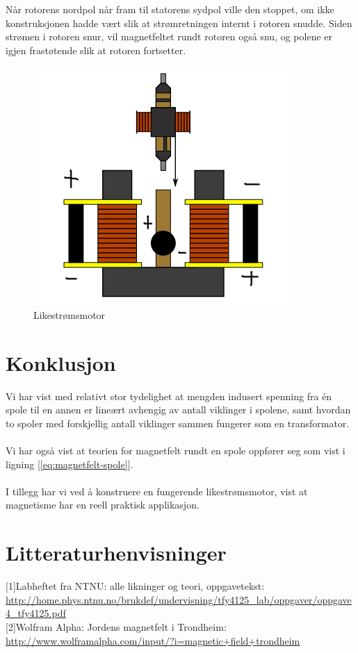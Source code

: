 \documentclass[12pt,norsk,a4paper]{article}
\begin{document}
 Når rotorens nordpol når fram til statorens sydpol ville den stoppet, om ikke konstruksjonen hadde vært slik at strømretningen internt i rotoren snudde. Siden strømen i rotoren snur, vil magnetfeltet rundt rotoren også snu, og polene er igjen frastøtende slik at rotoren fortsetter.


\begin{figure}[H]

\includegraphics{motor.png}
\caption{Likestrømsmotor}
\label{fig:motor}
\end{figure}
\clearpage

\section{Konklusjon}
Vi har vist med relativt stor tydelighet at mengden indusert spenning fra én spole til en annen er lineært avhengig av antall viklinger i spolene, samt hvordan to spoler med forskjellig antall viklinger sammen fungerer som en transformator.\\
\\
Vi har også vist at teorien for magnetfelt rundt en spole oppfører seg som vist i ligning [\ref{eq:magnetfelt-spole}]. \\
\\
I tillegg har vi ved å konstruere en fungerende likestrømsmotor, vist at magnetisme har en reell praktisk applikasjon.
\clearpage

\section{Litteraturhenvisninger}
{[1]}Labheftet fra NTNU: alle likninger og teori, oppgavetekst:  \url{http://home.phys.ntnu.no/brukdef/undervisning/tfy4125_lab/oppgaver/oppgave4_tfy4125.pdf} \\
{[2]}Wolfram Alpha: Jordens magnetfelt i Trondheim: \url{http://www.wolframalpha.com/input/?i=magnetic+field+trondheim}
\end{document}
